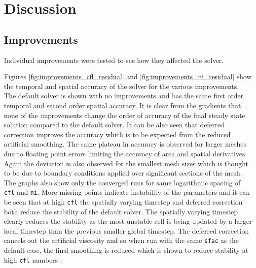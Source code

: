 \documentclass{article}
\begin{document}
\section{Discussion}

\subsection{Improvements}

Individual improvements were tested to see how they affected the solver.

Figures \ref{fig:improvements_cfl_residual} and \ref{fig:improvements_ni_residual} show the temporal and spatial accuracy of the solver for the various improvements.
The default solver is shown with no improvements and has the same first order temporal and second order spatial accuracy.
It is clear from the gradients that none of the improvements change the order of accuracy of the final steady state solution compared to the default solver.
It can be also seen that deferred correction improves the accuracy which is to be expected from the reduced artificial smoothing.
The same plateau in accuracy is observed for larger meshes due to floating point errors limiting the accuracy of area and spatial derivatives.
Again the deviation is also observed for the smallest mesh sizes which is thought to be due to boundary conditions applied over significant sections of the mesh.
The graphs also show only the converged runs for same logarithmic spacing of \texttt{cfl} and \texttt{ni}.
More missing points indicate instability of the parameters and it can be seen that at high \texttt{cfl} the spatially varying timestep and deferred correction both reduce the stability of the default solver.
The spatially varying timestep clearly reduces the stability as the most unstable cell is being updated by a larger local timestep than the previous smaller global timestep.
The deferred correction cancels out the artificial viscosity and so when run with the same \texttt{sfac} as the default case, the final smoothing is reduced which is shown to reduce stability at high \texttt{cfl} numbers \cite{interim}.
\end{document}
